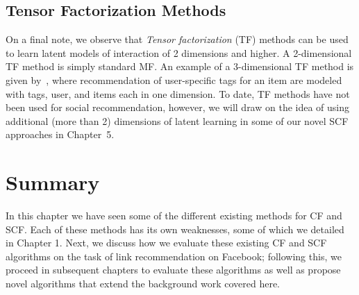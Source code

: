\subsection{Tensor Factorization Methods}


On a final note, we observe that \emph{Tensor factorization} (TF)
methods can be used to learn latent models of interaction of 2
dimensions and higher.  A 2-dimensional TF method is simply standard
MF.  An example of a 3-dimensional TF method is given by~\cite{tf},
where recommendation of user-specific tags for an item are modeled
with tags, user, and items each in one dimension.  To date, TF methods
have not been used for social recommendation, however, we will draw on
the idea of using additional (more than 2) dimensions of latent learning 
in some of our novel SCF approaches in Chapter~5.

\section{Summary}

In this chapter we have seen some of the different existing methods
for CF and SCF. Each of these methods has its own weaknesses, some of
which we detailed in Chapter 1. Next, we discuss how we evaluate these
existing CF and SCF algorithms on the task of link recommendation on
Facebook; following this, we proceed in subsequent chapters to
evaluate these algorithms as well as propose novel algorithms that
extend the background work covered here.


